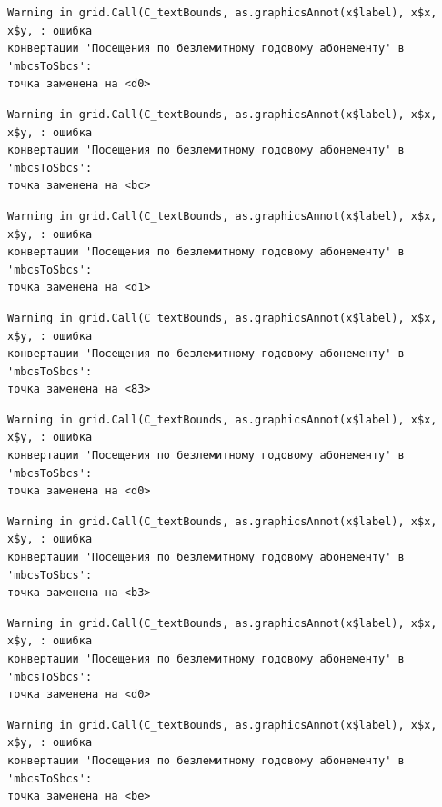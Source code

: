 \documentclass[
  letterpaper,
  DIV=11,
  numbers=noendperiod]{scrreprt}
\begin{document}
\begin{verbatim}
Warning in grid.Call(C_textBounds, as.graphicsAnnot(x$label), x$x, x$y, : ошибка
конвертации 'Посещения по безлемитному годовому абонементу' в 'mbcsToSbcs':
точка заменена на <d0>
\end{verbatim}

\begin{verbatim}
Warning in grid.Call(C_textBounds, as.graphicsAnnot(x$label), x$x, x$y, : ошибка
конвертации 'Посещения по безлемитному годовому абонементу' в 'mbcsToSbcs':
точка заменена на <bc>
\end{verbatim}

\begin{verbatim}
Warning in grid.Call(C_textBounds, as.graphicsAnnot(x$label), x$x, x$y, : ошибка
конвертации 'Посещения по безлемитному годовому абонементу' в 'mbcsToSbcs':
точка заменена на <d1>
\end{verbatim}

\begin{verbatim}
Warning in grid.Call(C_textBounds, as.graphicsAnnot(x$label), x$x, x$y, : ошибка
конвертации 'Посещения по безлемитному годовому абонементу' в 'mbcsToSbcs':
точка заменена на <83>
\end{verbatim}

\begin{verbatim}
Warning in grid.Call(C_textBounds, as.graphicsAnnot(x$label), x$x, x$y, : ошибка
конвертации 'Посещения по безлемитному годовому абонементу' в 'mbcsToSbcs':
точка заменена на <d0>
\end{verbatim}

\begin{verbatim}
Warning in grid.Call(C_textBounds, as.graphicsAnnot(x$label), x$x, x$y, : ошибка
конвертации 'Посещения по безлемитному годовому абонементу' в 'mbcsToSbcs':
точка заменена на <b3>
\end{verbatim}

\begin{verbatim}
Warning in grid.Call(C_textBounds, as.graphicsAnnot(x$label), x$x, x$y, : ошибка
конвертации 'Посещения по безлемитному годовому абонементу' в 'mbcsToSbcs':
точка заменена на <d0>
\end{verbatim}

\begin{verbatim}
Warning in grid.Call(C_textBounds, as.graphicsAnnot(x$label), x$x, x$y, : ошибка
конвертации 'Посещения по безлемитному годовому абонементу' в 'mbcsToSbcs':
точка заменена на <be>
\end{verbatim}
\end{document}
